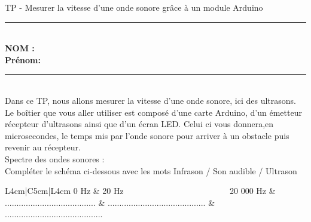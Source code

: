 \documentclass[11pt,a4paper]{article}
\begin{document}
\center \LARGE{TP - Mesurer la vitesse d'une onde sonore grâce à un module Arduino}
\\[0,3cm]

\normalsize

\hrule\
\\[0,2cm]

\flushleft \textbf{NOM :\\
Prénom:\\[0,2cm]
}
\hrule\
\\[0,2cm]

Dans ce TP, nous allons mesurer la vitesse d'une onde sonore, ici des ultrasons. Le boîtier que vous aller utiliser est composé d'une carte Arduino, d'un émetteur récepteur d'ultrasons ainsi que d'un écran LED. Celui ci vous donnera,en microsecondes, le temps mis par l'onde sonore pour arriver à un obstacle puis revenir au récepteur. \\[4mm] 


 Spectre des ondes sonores : \\[4mm]
Compléter le schéma ci-dessous avec les mots Infrason / Son audible / Ultrason


\begin{center}
\begin{tabular}{L{4cm}|C{5cm}|L{4cm}}
0 Hz & 20 Hz ~~~~~~~~~~~~~~~~~~~~~~~~ 20 000 Hz & \\
\hline  .......................................  & ..........................................  & ..........................................  \\
\end{tabular}
\end{center}

\vfill 
\end{document}
